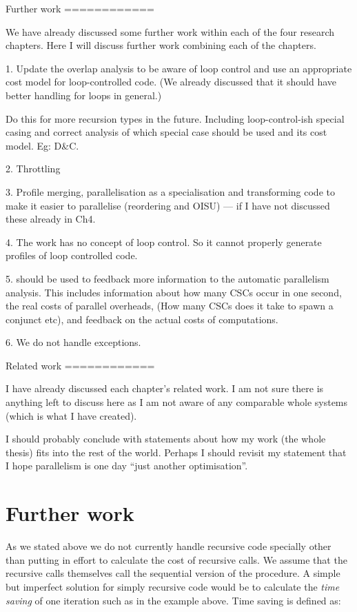 Further work
============

We have already discussed some further work within each of the four
research chapters.
Here I will discuss further work combining each of the chapters.

    1. Update the overlap analysis to be aware of loop control and use an
       appropriate cost model for loop-controlled code.
       (We already discussed that it should have better handling for loops
       in general.)

       Do this for more recursion types in the future.  Including
       loop-control-ish special casing and correct analysis of which special
       case should be used and its cost model.  Eg: D\&C.

    2. Throttling 

    3. Profile merging, parallelisation as a specialisation and transforming
       code to make it easier to parallelise (reordering and OISU) ---
       if I have not discussed these already in Ch4.

    4. The \tscope work has no concept of loop control.  So it cannot
       properly generate profiles of loop controlled code.

    5. \tscope should be used to feedback more information to the automatic
       parallelism analysis.
       This includes information about how many CSCs occur in one second,
       the real costs of parallel overheads, (How many CSCs does it take to
       spawn a conjunct etc),
       and feedback on the actual costs of computations.

    6. We do not handle exceptions.

Related work
============

I have already discussed each chapter's related work.
I am not sure there is anything left to discuss here as I am not aware of any
comparable whole systems (which is what I have created).

I should probably conclude with statements about how my work (the whole
thesis) fits into the rest of the world.
Perhaps I should revisit my statement that I hope parallelism is one day
``just another optimisation''.


\section{Further work}
\label{sec:further_work}

As we stated above we do not currently handle recursive code specially other
than putting in effort to calculate the cost of recursive calls.
We assume that the recursive calls themselves call the sequential version of
the procedure.
A simple but imperfect solution for simply recursive code would be to
calculate the \emph{time saving} of one iteration such as in the example
above.
Time saving is defined as:

